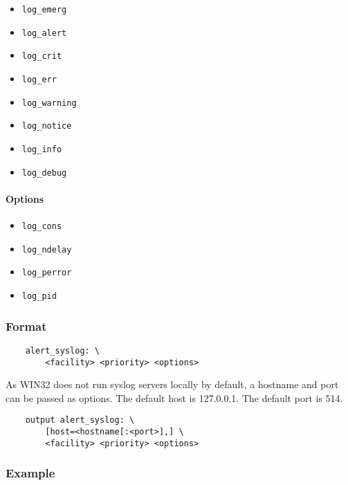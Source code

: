 \documentclass[english]{report}
\newenvironment{note}{
\samepage
    \vspace{10pt}{\textsf{
        {\hspace{7pt}\Huge{$\triangle$\hspace{-12.5pt}{\Large{$^!$}}}}\hspace{5pt}
        {\Large{NOTE}}
    }
    }
   \begin{center}
    \par\vspace{-17pt}

    \begin{lrbox}{\savepar}
    \begin{minipage}[r]{6in}
}
{
    \end{minipage}
    \end{lrbox}
    \fbox{
        \usebox{
            \savepar
	}
    }
    \par\vskip10pt
    \end{center}
}
\newenvironment{note}{
        \begin{rawhtml}
        <p><table border="1"><tr><td><b>
        Note:&nbsp;&nbsp;</b>
        \end{rawhtml}
}{
        \begin{rawhtml}
        </b></td></tr></table></p>
        \end{rawhtml}
}
\begin{document}
\begin{itemize}
\item \texttt{log\_emerg} 
\item \texttt{log\_alert}
\item \texttt{log\_crit}
\item \texttt{log\_err}
\item \texttt{log\_warning} 
\item \texttt{log\_notice}
\item \texttt{log\_info}
\item \texttt{log\_debug}
\end{itemize}

\paragraph{Options}

\begin{itemize}
\item \texttt{log\_cons} 
\item \texttt{log\_ndelay}
\item \texttt{log\_perror}
\item \texttt{log\_pid}
\end{itemize}

\subsubsection{Format}

\begin{verbatim}
    alert_syslog: \
        <facility> <priority> <options>
\end{verbatim}

\begin{note}

As WIN32 does not run syslog servers locally by default, a hostname and port
can be passed as options.  The default host is 127.0.0.1.  The default port is
514.

\end{note}

\begin{verbatim}
    output alert_syslog: \
        [host=<hostname[:<port>],] \
        <facility> <priority> <options>
\end{verbatim}

\subsubsection{Example}
\end{document}
